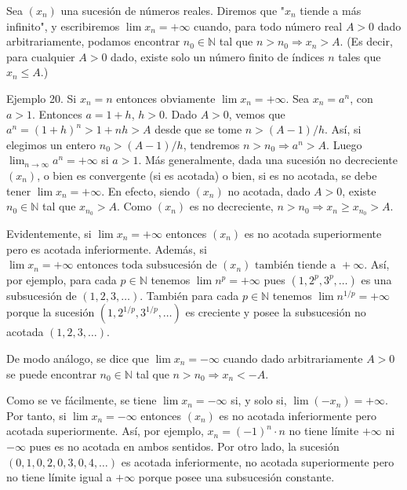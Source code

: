 \documentclass[12pt,oneside]{book}
\begin{document}
Sea \((x_n)\) una sucesión de números reales. Diremos que "\(x_n\) tiende a más infinito", y escribiremos \(\lim x_n = +\infty\) cuando, para todo número real \(A > 0\) dado arbitrariamente, podamos encontrar \(n_0 \in \mathbb{N}\) tal que \(n > n_0 \Rightarrow x_n > A\). (Es decir, para cualquier \(A > 0\) dado, existe solo un número finito de índices \(n\) tales que \(x_n \leq A\).)

Ejemplo 20. Si \(x_n = n\) entonces obviamente \(\lim x_n = +\infty\). Sea \(x_n = a^n\), con \(a > 1\). Entonces \(a = 1 + h\), \(h > 0\). Dado \(A > 0\), vemos que \(a^n = (1 + h)^n > 1 + nh > A\) desde que se tome \(n > (A-1)/h\). Así, si elegimos un entero \(n_0 > (A-1)/h\), tendremos \(n > n_0 \Rightarrow a^n > A\). Luego \(\lim_{n \to \infty} a^n = +\infty\) si \(a > 1\). Más generalmente, dada una sucesión no decreciente \((x_n)\), o bien es convergente (si es acotada) o bien, si es no acotada, se debe tener \(\lim x_n = +\infty\). En efecto, siendo \((x_n)\) no acotada, dado \(A > 0\), existe \(n_0 \in \mathbb{N}\) tal que \(x_{n_0} > A\). Como \((x_n)\) es no decreciente, \(n > n_0 \Rightarrow x_n \geq x_{n_0} > A\).

Evidentemente, si \(\lim x_n = +\infty\) entonces \((x_n)\) es no acotada superiormente pero es acotada inferiormente. Además, si \(\lim x_n = +\infty \text{ entonces toda subsucesión de } (x_n) \text{ también tiende a } +\infty\). Así, por ejemplo, para cada \(p \in \mathbb{N}\) tenemos \(\lim n^p = +\infty\) pues \((1, 2^p, 3^p, \ldots)\) es una subsucesión de \((1, 2, 3, \ldots)\). También para cada \(p \in \mathbb{N}\) tenemos \(\lim n^{1/p} = +\infty\) porque la sucesión \((1, 2^{1/p}, 3^{1/p}, \ldots)\) es creciente y posee la subsucesión no acotada \((1, 2, 3, \ldots)\).

De modo análogo, se dice que \(\lim x_n = -\infty\) cuando dado arbitrariamente \(A > 0\) se puede encontrar \(n_0 \in \mathbb{N}\) tal que \(n > n_0 \Rightarrow x_n < -A\).

Como se ve fácilmente, se tiene \(\lim x_n = -\infty\) si, y solo si, \(\lim(-x_n) = +\infty\). Por tanto, si \(\lim x_n = -\infty\) entonces \((x_n)\) es no acotada inferiormente pero acotada superiormente. Así, por ejemplo, \(x_n = (-1)^n \cdot n\) no tiene límite \(+\infty\) ni \(-\infty\) pues es no acotada en ambos sentidos. Por otro lado, la sucesión \((0, 1, 0, 2, 0, 3, 0, 4, \ldots)\) es acotada inferiormente, no acotada superiormente pero no tiene límite igual a \(+\infty\) porque posee una subsucesión constante.
\end{document}
